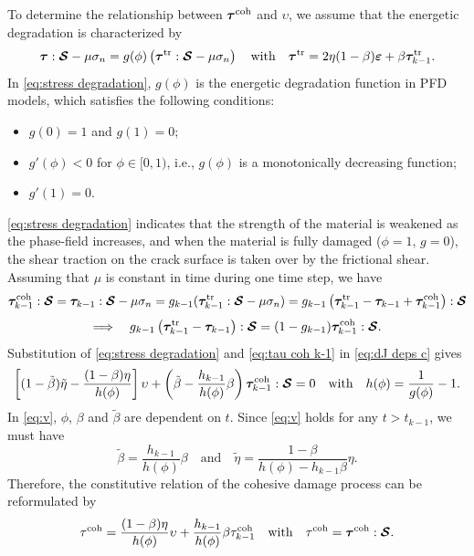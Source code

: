 \documentclass{article}
\begin{document}
To determine the relationship between $\bm\tau^{\rm coh}$ and $\upsilon$, we assume that the energetic degradation is characterized by
\begin{equation}\label{eq:stress degradation}
  \bm\tau : \bm{\mathcal S} - \mu\sigma_n = g(\phi)\left(\bm\tau^{\rm tr} : \bm{\mathcal S} - \mu\sigma_n\right)\quad\text{with}\quad\bm\tau^{\rm tr} = 2\eta(1-\beta)\bm\varepsilon + \beta\bm\tau_{k-1}^{\rm tr}.
\end{equation}
In \eqref{eq:stress degradation}, $g(\phi)$ is the energetic degradation function in PFD models, which satisfies the following conditions:
\begin{itemize}
  \item $g(0) = 1$ and $g(1) = 0$;
  \item $g'(\phi) < 0$ for $\phi\in[0,1)$, i.e., $g(\phi)$ is a monotonically decreasing function;
  \item $g'(1) = 0$.
\end{itemize}
\eqref{eq:stress degradation} indicates that the strength of the material is weakened as the phase-field increases, and when the material is fully damaged ($\phi = 1$, $g = 0$), the shear traction on the crack surface is taken over by the frictional shear. Assuming that $\mu$ is constant in time during one time step, we have
\[
  \bm\tau_{k-1}^{\rm coh} : \bm{\mathcal S} = \bm\tau_{k-1} : \bm{\mathcal S} - \mu\sigma_n = g_{k-1}(\bm\tau_{k-1}^{\rm tr} : \bm{\mathcal S} - \mu\sigma_n)
  = g_{k-1}\left(\bm\tau_{k-1}^{\rm tr} - \bm\tau_{k-1} + \bm\tau_{k-1}^{\rm coh}\right) : \bm{\mathcal S}
\]
\begin{equation}\label{eq:tau coh k-1}
  \Longrightarrow\quad g_{k-1}\left(\bm\tau_{k-1}^{\rm tr} - \bm\tau_{k-1}\right) : \bm{\mathcal S} = (1-g_{k-1})\bm\tau_{k-1}^{\rm coh} : \bm{\mathcal S}.
\end{equation}
Substitution of \eqref{eq:stress degradation} and \eqref{eq:tau coh k-1} in \eqref{eq:dJ deps c} gives
\begin{equation}\label{eq:v}
  \left[(1-\tilde\beta)\tilde\eta - \frac{(1-\beta)\eta}{h(\phi)}\right]\upsilon + \left(\tilde\beta - \frac{h_{k-1}}{h(\phi)}\beta\right)\bm\tau_{k-1}^{\rm coh} : \bm{\mathcal S} = 0
  \quad\text{with}\quad h(\phi) = \frac{1}{g(\phi)} - 1.
\end{equation}
In \cref{eq:v}, $\phi$, $\beta$ and $\tilde\beta$ are dependent on $t$. Since \cref{eq:v} holds for any $t > t_{k-1}$, we must have
\begin{equation}\label{eq:coh relaxation}
  \tilde\beta = \frac{h_{k-1}}{h(\phi)}\beta\quad\text{and}\quad\tilde\eta = \frac{1 - \beta}{h(\phi) - h_{k-1}\beta}\eta.
\end{equation}
Therefore, the constitutive relation of the cohesive damage process can be reformulated by
\begin{equation}\label{eq:tau coh raw}
  \tau^{\rm coh} = \frac{(1-\beta)\eta}{h(\phi)}\upsilon + \frac{h_{k-1}}{h(\phi)}\beta\tau_{k-1}^{\rm coh}\quad\text{with}\quad\tau^{\rm coh} = \bm\tau^{\rm coh} : \bm{\mathcal S}.
\end{equation}
\end{document}
